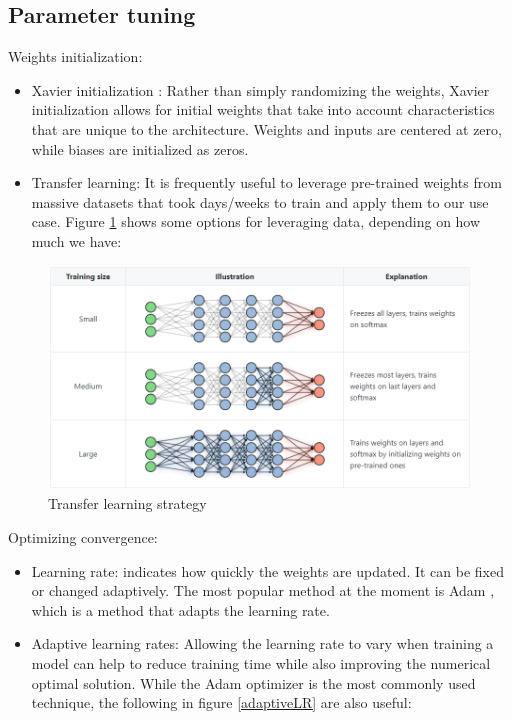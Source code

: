 \subsection{Parameter tuning}

Weights initialization:
\begin{itemize}
    \item[] Xavier initialization \cite{xavier_init}: Rather than simply randomizing the weights, Xavier initialization allows for initial weights that take into account characteristics that are unique to the architecture. 
    Weights and inputs are centered at zero, while biases are initialized as zeros.
    \item[] Transfer learning: It is frequently useful to leverage pre-trained weights from massive datasets that took days/weeks to train and apply them to our use case. Figure \ref{transferlearning} shows some options for leveraging data, depending on how much we have:
\end{itemize}

%
      
\begin{figure}[!h]
    \centering
    \includegraphics[width=1.0\textwidth]{figures/transferlearning.PNG}
    \caption{Transfer learning strategy \cite{amidi2018deep}}
    \label{transferlearning}
\end{figure}

Optimizing convergence:
\begin{itemize}
    \item[] Learning rate: indicates how quickly the weights are updated. 
    It can be fixed or changed adaptively. 
    The most popular method at the moment is Adam \cite{kingma2015adam}, which is a method that adapts the learning rate.
    \item[] Adaptive learning rates: Allowing the learning rate to vary when training a model can help to reduce training time while also improving the numerical optimal solution. While the Adam optimizer is the most commonly used technique, the following in figure \ref{adaptiveLR} are also useful:
\end{itemize}

